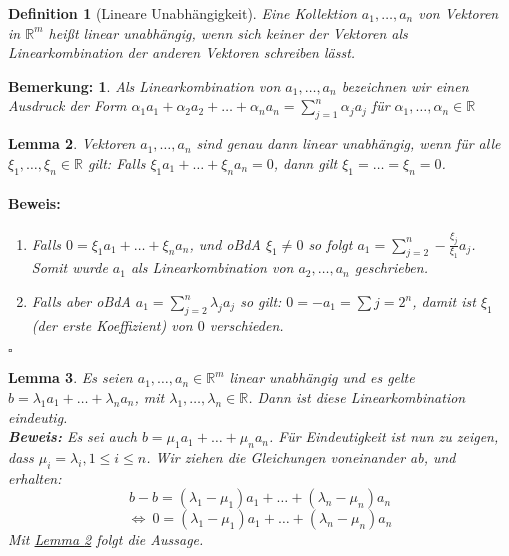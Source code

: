 \documentclass{report}
\newcommand{\IN}[1]{\index{#1|BH}}
\newcommand{\lb}{\lambda}
\newcommand{\R}{\mathbb{R}}
\newcommand{\al}{\alpha}
\theoremstyle{customrem}
\newtheorem*{bem}{Bemerkung:}
\theoremstyle{customdef}
\newtheorem{definition}{Definition}[chapter]
\newtheorem{lemma}[definition]{Lemma}
\renewenvironment{proof}{\vspace{-.75cm}\paragraph{Beweis: }}{\vspace{-.5cm}\hfill$\square$}
\begin{document}
	\vspace{.2cm}
	\begin{definition}[Lineare Unabhängigkeit]
		\IN{Lineare!Unabhängigkeit}
		\label{deflineareunab}
		Eine Kollektion $a_1, \dots, a_n$ von Vektoren in $\R^m$ heißt linear unabhängig, wenn sich keiner der Vektoren als Linearkombination der anderen Vektoren schreiben lässt.
	\end{definition}
	
	\begin{bem}
		Als Linearkombination von $a_1, \dots, a_n$ bezeichnen  wir einen Ausdruck der Form $\al_1a_1 + \al_2 a_2 + \ldots + \al_n a_n = \sum_{j=1}^n \al_j a_j$ für $\al_1, \dots, \al_n \in \R$
	\end{bem}

	\begin{lemma}
		\label{lem10}
		Vektoren $a_1, \dots, a_n$ sind genau dann linear unabhängig, wenn für alle $\xi_1, \dots, \xi_n \in\R$ gilt: Falls $\xi_1a_1 + \dots + \xi_na_n = 0$, dann gilt $\xi_1 = \dots = \xi_n = 0$.\\
		\begin{proof}
			\begin{enumerate}
				\itemsep-.125cm
				\item Falls $0 = \xi_1 a_1 + \dots + \xi_n a_n$, und oBdA $\xi_1 \neq 0$ so folgt $a_1 = \sum_{j=2}^n -\frac{\xi_j}{\xi_1} a_j$. Somit wurde $a_1$ als Linearkombination von $a_2, \dots, a_n$ geschrieben.
				\item Falls aber oBdA $a_1 = \sum_{j=2}^n \lb_j a_j$ so gilt: $0 = -a_1 = \sum{j=2}^n$, damit ist $\xi_1$ (der erste Koeffizient) von $0$ verschieden.
			\end{enumerate}
		\end{proof}
	\end{lemma}
	
	\begin{lemma}
		\label{lem11}
		Es seien $a_1, \dots, a_n \in \R^m$  linear unabhängig und es gelte $b = \lb_1a_1 + \dots + \lb_n a_n$, mit $\lb_1, \dots, \lb_n \in \R$. Dann ist diese Linearkombination eindeutig.\\
		\textbf{Beweis:} Es sei auch $b = \mu_1 a_1 + \dots + \mu_n a_n$. Für Eindeutigkeit ist nun zu zeigen, dass $\mu_i = \lb_i, 1 \le i \le n$.
		Wir ziehen die Gleichungen voneinander ab, und erhalten:
		$$
		b - b= (\lb_1 - \mu_1) a_1 + \ldots + (\lb_n - \mu_n) a_n$$$$
		\Leftrightarrow \ 0 = (\lb_1 - \mu_1) a_1 + \ldots + (\lb_n - \mu_n) a_n
		$$
		Mit \hyperref[lem10]{Lemma \ref{lem10}} folgt die Aussage.
	\end{lemma}
	
\end{document}
